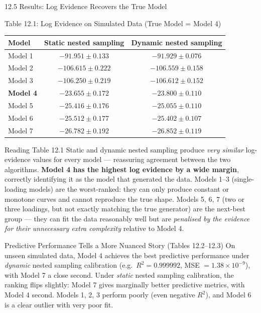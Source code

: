 \documentclass[aspectratio=169,10pt]{beamer}
\begin{document}
\begin{frame}[allowframebreaks]{12.5 Results: Log Evidence Recovers the True Model}

\begin{block}{Table 12.1: Log Evidence on Simulated Data (True Model = Model 4)}
\begin{center}
{\scriptsize
\begin{tabular}{lcc}
\toprule
Model & Static nested sampling & Dynamic nested sampling \\
\midrule
Model 1 & $-91.951 \pm 0.133$ & $-91.929 \pm 0.076$ \\
Model 2 & $-106.615 \pm 0.222$ & $-106.559 \pm 0.158$ \\
Model 3 & $-106.250 \pm 0.219$ & $-106.612 \pm 0.152$ \\
\textbf{Model 4} & $\mathbf{-23.655 \pm 0.172}$ & $\mathbf{-23.800 \pm 0.110}$ \\
Model 5 & $-25.416 \pm 0.176$ & $-25.055 \pm 0.110$ \\
Model 6 & $-25.512 \pm 0.177$ & $-25.402 \pm 0.107$ \\
Model 7 & $-26.782 \pm 0.192$ & $-26.852 \pm 0.119$ \\
\bottomrule
\end{tabular}
}
\end{center}
\end{block}

\begin{alertblock}{Reading Table 12.1}
Static and dynamic nested sampling produce \emph{very similar} log-evidence values for every model --- reassuring agreement between the two algorithms. \textbf{Model 4 has the highest log evidence by a wide margin}, correctly identifying it as the model that generated the data. Models 1--3 (single-loading models) are the worst-ranked: they can only produce constant or monotone curves and cannot reproduce the true shape. Models 5, 6, 7 (two or three loadings, but not exactly matching the true generator) are the next-best group --- they can fit the data reasonably well but are \emph{penalised by the evidence for their unnecessary extra complexity} relative to Model 4.
\end{alertblock}

\framebreak

\begin{block}{Predictive Performance Tells a More Nuanced Story (Tables 12.2--12.3)}
On unseen simulated data, Model 4 achieves the best predictive performance under \emph{dynamic} nested sampling calibration (e.g.\ $R^2=0.999992$, MSE $=1.38\times10^{-9}$), with Model 7 a close second. Under \emph{static} nested sampling calibration, the ranking flips slightly: Model 7 gives marginally better predictive metrics, with Model 4 second. Models 1, 2, 3 perform poorly (even negative $R^2$), and Model 6 is a clear outlier with very poor fit.
\end{block}


\end{frame}
\end{document}
